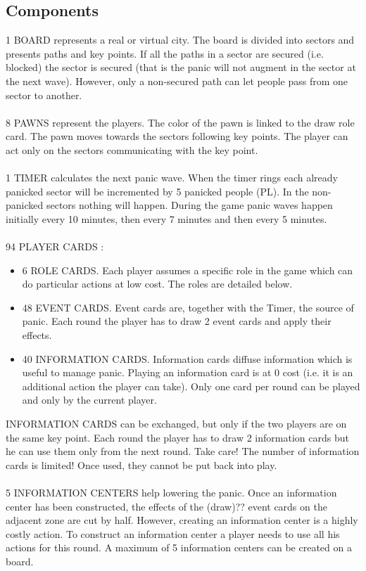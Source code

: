\subsection*{Components}
1 BOARD represents a real or virtual city. The board is divided into sectors and presents paths and key points. If all the paths in a sector are secured (i.e. blocked) the sector is secured (that is the panic will not augment in the sector at the next wave). However, only a non-secured path can let people pass from one sector to another.\\
\\
8 PAWNS represent the players. The color of the pawn is linked to the draw role card. The pawn moves towards the sectors following key points. The player can act only on the sectors communicating with the key point.\\
\\
1 TIMER calculates the next panic wave. When the timer rings each already panicked sector will be incremented by 5 panicked people (PL). In the non-panicked sectors nothing will happen. During the game panic waves happen initially every 10 minutes, then every 7 minutes and then every 5 minutes.\\
\\
94 PLAYER CARDS :
\begin{itemize}
	\item 6 ROLE CARDS. Each player assumes a specific role in the game which can do particular actions at low cost. The roles are detailed below.
	\item 48 EVENT CARDS. Event cards are, together with the Timer, the source of panic. Each round the player has to draw 2 event cards and apply their effects.
	\item 40 INFORMATION CARDS. Information cards diffuse information which is useful to manage panic. Playing an information card is at 0 cost (i.e. it is an additional action the player can take). Only one card per round can be played and only by the current player. 
\end{itemize}
%
INFORMATION CARDS can be exchanged, but only if the two players are on the same key point. Each round the player has to draw 2 information cards but he can use them only from the next round. Take care! The number of information cards is limited! Once used, they cannot be put back into play.\\
\\
5 INFORMATION CENTERS help lowering the panic. Once an information center has been constructed, the effects of the (draw)?? event cards on the adjacent zone are cut by half. However, creating an information center is a highly costly action. To construct an information center a player needs to use all his actions for this round. A maximum of 5 information centers can be created on a board.\\
